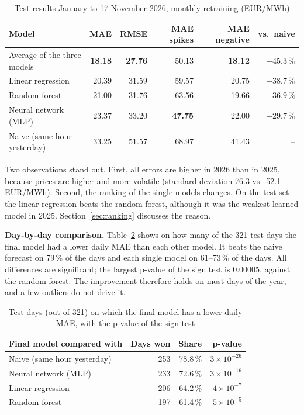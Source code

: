 \documentclass[12pt,oneside]{article}
\begin{document}
\begin{table}[!htbp]
    \centering
    \caption{Test results January to 17 November 2026, monthly retraining (EUR/MWh)}
    \small
    \begin{tabular}{lrrrrr}
        \toprule
        Model & MAE & RMSE & MAE spikes & MAE negative & vs.\ naive \\
        \midrule
        Average of the three models & \textbf{18.18} & \textbf{27.76} & 50.13 & \textbf{18.12} & $-45.3\,\%$ \\
        Linear regression & 20.39 & 31.59 & 59.57 & 20.75 & $-38.7\,\%$ \\
        Random forest & 21.00 & 31.76 & 63.56 & 19.66 & $-36.9\,\%$ \\
        Neural network (MLP) & 23.37 & 33.20 & \textbf{47.75} & 22.00 & $-29.7\,\%$ \\
        Naive (same hour yesterday) & 33.25 & 51.57 & 68.97 & 41.43 & -- \\
        \bottomrule
    \end{tabular}
    \label{tab:test}
\end{table}

Two observations stand out. First, all errors are higher in 2026 than in 2025, because prices are higher and more volatile (standard deviation 76.3 vs.\ 52.1\,EUR/MWh). Second, the ranking of the single models changes. On the test set the linear regression beats the random forest, although it was the weakest learned model in 2025. Section~\ref{sec:ranking} discusses the reason.

\textbf{Day-by-day comparison.} Table~\ref{tab:wins} shows on how many of the 321 test days the final model had a lower daily MAE than each other model. It beats the naive forecast on 79\,\% of the days and each single model on 61--73\,\% of the days. All differences are significant; the largest p-value of the sign test is 0.00005, against the random forest. The improvement therefore holds on most days of the year, and a few outliers do not drive it.

\begin{table}[!htbp]
    \centering
    \caption{Test days (out of 321) on which the final model has a lower daily MAE, with the p-value of the sign test}
    \begin{tabular}{lrrr}
        \toprule
        Final model compared with & Days won & Share & p-value \\
        \midrule
        Naive (same hour yesterday) & 253 & 78.8\,\% & $3 \times 10^{-26}$ \\
        Neural network (MLP) & 233 & 72.6\,\% & $3 \times 10^{-16}$ \\
        Linear regression & 206 & 64.2\,\% & $4 \times 10^{-7}$ \\
        Random forest & 197 & 61.4\,\% & $5 \times 10^{-5}$ \\
        \bottomrule
    \end{tabular}
    \label{tab:wins}
\end{table}
\end{document}
